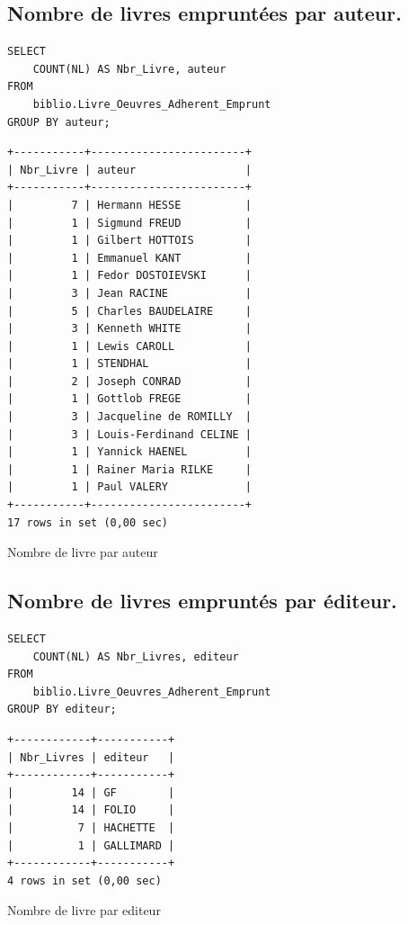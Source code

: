 \documentclass{article}
\begin{document}
\subsection{Nombre de livres empruntées par auteur.}
\begin{center}
\begin{minipage}{0.5\linewidth}
\begin{listing}[H]
\begin{verbatim}
SELECT 
    COUNT(NL) AS Nbr_Livre, auteur
FROM
    biblio.Livre_Oeuvres_Adherent_Emprunt
GROUP BY auteur;
\end{verbatim}
\begin{verbatim}
+-----------+------------------------+
| Nbr_Livre | auteur                 |
+-----------+------------------------+
|         7 | Hermann HESSE          |
|         1 | Sigmund FREUD          |
|         1 | Gilbert HOTTOIS        |
|         1 | Emmanuel KANT          |
|         1 | Fedor DOSTOIEVSKI      |
|         3 | Jean RACINE            |
|         5 | Charles BAUDELAIRE     |
|         3 | Kenneth WHITE          |
|         1 | Lewis CAROLL           |
|         1 | STENDHAL               |
|         2 | Joseph CONRAD          |
|         1 | Gottlob FREGE          |
|         3 | Jacqueline de ROMILLY  |
|         3 | Louis-Ferdinand CELINE |
|         1 | Yannick HAENEL         |
|         1 | Rainer Maria RILKE     |
|         1 | Paul VALERY            |
+-----------+------------------------+
17 rows in set (0,00 sec)	
\end{verbatim}
\caption{Nombre de livre par auteur}
\end{listing}
\end{minipage}
\end{center}
\subsection{Nombre de livres empruntés par éditeur.}
\begin{center}
	\begin{minipage}{0.5\linewidth}
\begin{listing}[H]
\begin{verbatim}
SELECT 
    COUNT(NL) AS Nbr_Livres, editeur
FROM
    biblio.Livre_Oeuvres_Adherent_Emprunt
GROUP BY editeur;
\end{verbatim}
\begin{verbatim}
+------------+-----------+
| Nbr_Livres | editeur   |
+------------+-----------+
|         14 | GF        |
|         14 | FOLIO     |
|          7 | HACHETTE  |
|          1 | GALLIMARD |
+------------+-----------+
4 rows in set (0,00 sec)
\end{verbatim}
\caption{Nombre de livre par editeur}
\end{listing}
\end{minipage}
\end{center}
\end{document}
